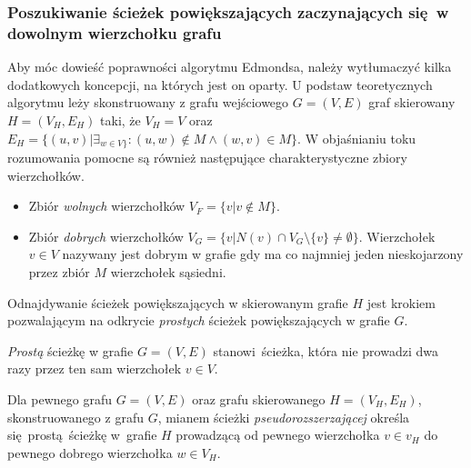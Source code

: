 \subsubsection{\textbf{Poszukiwanie ścieżek powiększających zaczynających się w dowolnym wierzchołku grafu}}
\par{
  Aby móc dowieść poprawności algorytmu Edmondsa, należy wytłumaczyć kilka dodatkowych koncepcji, na których jest on oparty.
  U podstaw teoretycznych algorytmu leży skonstruowany z grafu wejściowego $G=(V, E)$ graf skierowany $H=(V_H, E_H)$ taki, że $V_H=V$ oraz $E_H=\{(u, v)|\exists_{w\in V\}}:(u, w) \notin M \land (w, v) \in M\}$.
  W objaśnianiu toku rozumowania pomocne są również następujące charakterystyczne zbiory wierzchołków.
  \begin{itemize}
    \item Zbiór \emph{wolnych} wierzchołków $V_F=\{v | v \notin M\}$.
    \item Zbiór \emph{dobrych} wierzchołków $V_G=\{v | N(v) \cap V_G \setminus \{v\} \neq \emptyset\}$. Wierzchołek $v\in V$ nazywany jest dobrym w grafie gdy ma co najmniej jeden nieskojarzony przez zbiór $M$ wierzchołek sąsiedni.
  \end{itemize}
  
  Odnajdywanie ścieżek powiększających w skierowanym grafie $H$ jest krokiem pozwalającym na odkrycie \emph{prostych} ścieżek powiększających w grafie $G$.
  \begin{definition}
    \emph{Prostą} ścieżkę w grafie $G=(V, E)$ stanowi ścieżka, która nie prowadzi dwa razy przez ten sam wierzchołek $v \in V$.
  \end{definition}
  \begin{definition}
    Dla pewnego grafu $G=(V, E)$ oraz grafu skierowanego $H=(V_H,E_H)$, skonstruowanego z grafu $G$, mianem ścieżki \emph{pseudorozszerzającej} określa się prostą ścieżkę w~grafie $H$ prowadzącą od pewnego wierzchołka $v \in v_H$ do pewnego dobrego wierzchołka $w \in V_H$.
  \end{definition}

}
